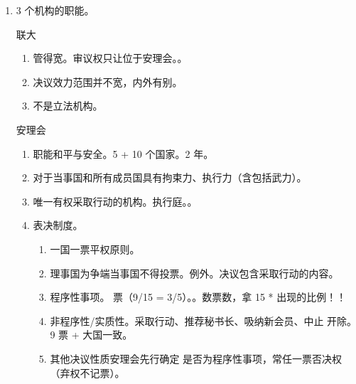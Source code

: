 \begin{enumerate}
\begin{enumerate}
          \item 3 个机构的职能。
                \begin{kk}{联大}
                  \begin{enumerate}
                    \item 管得宽。审议权只让位于安理会。。
                    \item 决议效力范围并不宽，内外有别。
                    \item 不是立法机构。
                  \end{enumerate}
                \end{kk}

                \begin{kk}{安理会}
                  \begin{enumerate}
                    \item 职能和平与安全。5 + 10 个国家。2 年。
                    \item 对于当事国和所有成员国具有拘束力、执行力（含包括武力）。
                    \item 唯一有权采取行动的机构。\ydy 执行庭。。
                    \item 表决制度。
                          \begin{enumerate}
                            \item 一国一票平权原则。
                            \item 理事国为争端当事国不得投票。例外。决议包含采取行动的内容。
                            \item 程序性事项。 票（9/15 = 3/5）。。数票数，拿 15 * 出现的比例！！
                            \item 非程序性/实质性。采取行动、推荐秘书长、吸纳新会员、中止 \hz 开除。9 票 + 大国一致。
                            \item 其他决议性质安理会先行确定 \yjt 是否为程序性事项，常任一票否决权（弃权不记票）。
                          \end{enumerate}
                  \end{enumerate}
                \end{kk}


\end{enumerate}
\end{enumerate}

